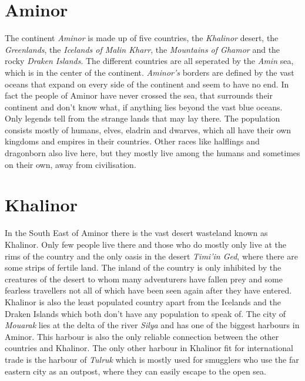 \documentclass[oneside]{book}
\begin{document}
	\chapter{Aminor}
	The continent \textit{Aminor} is made up of five countries, the \textit{Khalinor} desert, the \textit{Greenlands}, the \textit{Icelands of Malin Kharr}, the \textit{Mountains of Ghamor} and the rocky \textit{Draken Islands}. 
	The different countries are all seperated by the \textit{Amin} sea, which is in the center of the continent. 
	\textit{Aminor's} borders are defined by the vast oceans that expand on every side of the continent and seem to have no end.
	In fact the people of Aminor have never crossed the sea, that surrounds their continent and don't know what, if anything lies beyond the vast blue oceans. 
	Only legends tell from the strange lands that may lay there. 
	The population consists mostly of humans, elves, eladrin and dwarves, which all have their own kingdoms and empires in their countries. 
	Other races like halflings and dragonborn also live here, but they mostly live among the humans and sometimes on their own, away from civilisation.
	
	\chapter{Khalinor}
	In the South East of Aminor there is the vast desert wasteland known as Khalinor. 
	Only few people live there and those who do mostly only live at the rims of the country and the only oasis in the desert \textit{Timi'in Ged}, where there are some strips of fertile land. 
	The inland of the country is only inhibited by the creatures of the desert to whom many adventurers have fallen prey and some fearless travellers not all of which have been seen again after they have entered. 
	Khalinor is also the least populated country apart from the Icelands and the Draken Islands which both don't have any population to speak of. 
	The city of \textit{Mouarak} lies at the delta of the river \textit{Silya} and has one of the biggest harbours in Aminor. 
	This harbour is also the only reliable connection between the other countries and Khalinor. 
	The only other harbour in Khalinor fit for international trade is the harbour of \textit{Tulruk} which is mostly used for smugglers who use the far eastern city as an outpost, where they can easily escape to the open sea.
 
\end{document}
